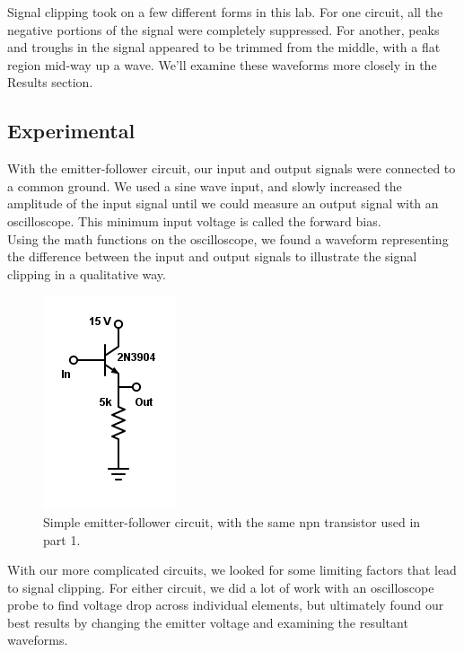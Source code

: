 \documentclass[11pt]{article}
\begin{document}
Signal clipping took on a few different forms in this lab. For one circuit, all the negative portions of the signal were completely suppressed. For another, peaks and troughs in the signal appeared to be trimmed from the middle, with a flat region mid-way up a wave. We'll examine these waveforms more closely in the Results section.\\

\subsection{Experimental}

With the emitter-follower circuit, our input and output signals were connected to a common ground. We used a sine wave input, and slowly increased the amplitude of the input signal until we could measure an output signal with an oscilloscope. This minimum input voltage is called the forward bias.\\

Using the math functions on the oscilloscope, we found a waveform representing the difference between the input and output signals to illustrate the signal clipping in a qualitative way.\\

\begin{figure}[H]
    \centering
    \includegraphics[scale=0.6]{Diagrams/c-2.png}
    \caption{Simple emitter-follower circuit, with the same npn transistor used in part 1.}
    \label{circuit:2}
\end{figure}

With our more complicated circuits, we looked for some limiting factors that lead to signal clipping. For either circuit, we did a lot of work with an oscilloscope probe to find voltage drop across individual elements, but ultimately found our best results by changing the emitter voltage and examining the resultant waveforms.\\
\end{document}
